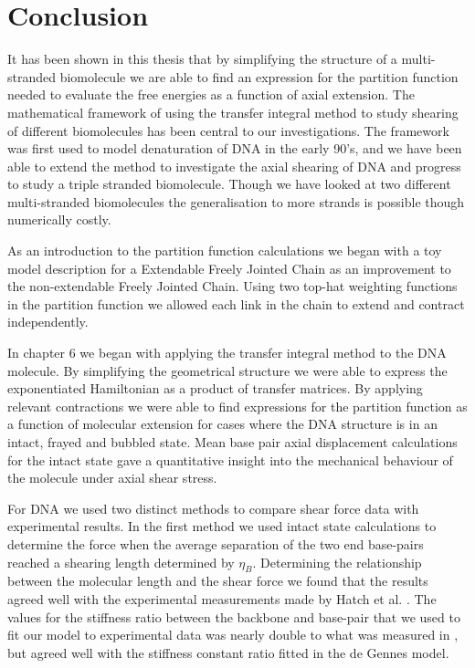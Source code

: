 \chapter{Conclusion}

It has been shown in this thesis that by simplifying the structure of a multi-stranded biomolecule we are able to find an expression for the partition function needed to evaluate the free energies as a function of axial extension. The mathematical framework of using the transfer integral method to study shearing of different biomolecules has been central to our investigations. The framework was first used to model denaturation of DNA in the early 90's, and we have been able to extend the method to investigate the axial shearing of DNA and progress to study a triple stranded biomolecule. Though we have looked at two different multi-stranded biomolecules the generalisation to more strands is possible though numerically costly.

As an introduction to the partition function calculations we began with a toy model description for a Extendable Freely Jointed Chain as an improvement to the non-extendable Freely Jointed Chain. Using two top-hat weighting functions in the partition function we allowed each link in the chain to extend and contract independently. 

In chapter 6 we began with applying the transfer integral method to the DNA molecule. By simplifying the geometrical structure we were able to express the exponentiated Hamiltonian as a product of transfer matrices. By applying relevant contractions we were able to find expressions for the partition function as a function of molecular extension for cases where the DNA structure is in an intact, frayed and bubbled state. Mean base pair axial displacement calculations for the intact state gave a quantitative insight into the mechanical behaviour of the molecule under axial shear stress.  

For DNA we used two distinct methods to compare shear force data with experimental results. In the first method we used intact state calculations to determine the force when the average separation of the two end base-pairs reached a shearing length determined by $\eta_{B}$. Determining the relationship between the molecular length and the shear force we found that the results agreed well with the  experimental measurements made by Hatch et al. \cite{Hatch2008}. The values for the stiffness ratio between the backbone and base-pair that we used to fit our model to experimental data was nearly double to what was measured in \cite{Hatch2008}, but agreed well with the stiffness constant ratio fitted in the de Gennes model. 

